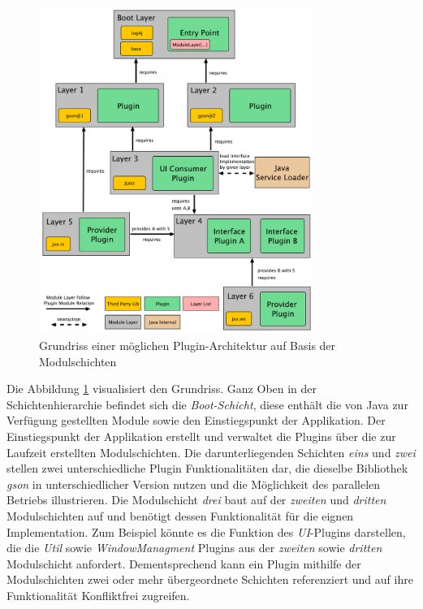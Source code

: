 	\begin{figure}[t]
		   \centering
		   \captionsetup{justification=centering}
		   \includegraphics[width=0.8\textwidth]{material/images/ModulLayerDepsDraw.pdf}
		   \caption{Grundriss einer möglichen Plugin-Architektur auf Basis der Modulschichten}
		   \label{fig:ModSchichtKonzept}
	\end{figure}
\newpage	
	Die Abbildung \ref{fig:ModSchichtKonzept} visualisiert den Grundriss. Ganz Oben in der Schichtenhierarchie befindet sich die \textit{Boot-Schicht}, diese enthält die von Java zur Verfügung gestellten Module sowie den Einstiegspunkt der Applikation. Der Einstiegspunkt der Applikation erstellt und verwaltet die Plugins über die zur Laufzeit erstellten Modulschichten. Die darunterliegenden Schichten \textit{eins} und \textit{zwei} stellen zwei unterschiedliche Plugin Funktionalitäten dar, die dieselbe Bibliothek \textit{gson} in unterschiedlicher Version nutzen und die Möglichkeit des parallelen Betriebs illustrieren. Die Modulschicht \textit{drei} baut auf der \textit{zweiten} und \textit{dritten} Modulschichten auf und benötigt dessen Funktionalität für die eignen Implementation. Zum Beispiel könnte es die Funktion des \textit{UI}-Plugins darstellen, die die \textit{Util} sowie \textit{WindowManagment} Plugins aus der \textit{zweiten} sowie \textit{dritten} Modulschicht anfordert. Dementsprechend kann ein Plugin mithilfe der Modulschichten zwei oder mehr übergeordnete Schichten referenziert und auf ihre Funktionalität Konfliktfrei zugreifen.\newline
